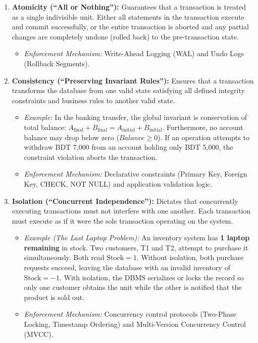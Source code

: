 \begin{enumerate}
\item \textbf{Atomicity (``All or Nothing''):}
Guarantees that a transaction is treated as a single indivisible unit. Either all statements in the transaction execute and commit successfully, or the entire transaction is aborted and any partial changes are completely undone (rolled back) to the pre-transaction state.
\begin{itemize}
\item \textit{Enforcement Mechanism:} Write-Ahead Logging (WAL) and Undo Logs (Rollback Segments).
\end{itemize}

\item \textbf{Consistency (``Preserving Invariant Rules''):}
Ensures that a transaction transforms the database from one valid state satisfying all defined integrity constraints and business rules to another valid state.
\begin{itemize}
\item \textit{Example:} In the banking transfer, the global invariant is conservation of total balance: $A_{\text{final}} + B_{\text{final}} = A_{\text{initial}} + B_{\text{initial}}$. Furthermore, no account balance may drop below zero ($Balance \ge 0$). If an operation attempts to withdraw BDT 7,000 from an account holding only BDT 5,000, the constraint violation aborts the transaction.
\item \textit{Enforcement Mechanism:} Declarative constraints (Primary Key, Foreign Key, CHECK, NOT NULL) and application validation logic.
\end{itemize}

\item \textbf{Isolation (``Concurrent Independence''):}
Dictates that concurrently executing transactions must not interfere with one another. Each transaction must execute as if it were the sole transaction operating on the system.
\begin{itemize}
\item \textit{Example (The Last Laptop Problem):} An inventory system has \textbf{1 laptop remaining} in stock. Two customers, T1 and T2, attempt to purchase it simultaneously. Both read $\text{Stock} = 1$. Without isolation, both purchase requests succeed, leaving the database with an invalid inventory of $\text{Stock} = -1$. With isolation, the DBMS serializes or locks the record so only one customer obtains the unit while the other is notified that the product is sold out.
\item \textit{Enforcement Mechanism:} Concurrency control protocols (Two-Phase Locking, Timestamp Ordering) and Multi-Version Concurrency Control (MVCC).
\end{itemize}


\end{enumerate}

